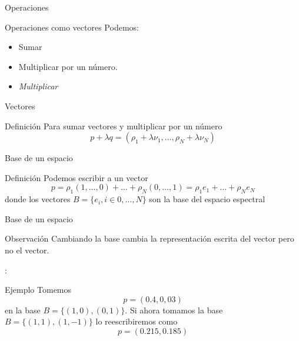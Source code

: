 \documentclass[]{beamer}
\begin{document}
\begin{frame}{Operaciones}
  \begin{block}{Operaciones como vectores}
    Podemos:
    \begin{itemize}[<+->]
      \item Sumar
      \item Multiplicar por un número.
      \item \emph{Multiplicar}
    \end{itemize}
  \end{block}
\end{frame}

\begin{frame}{Vectores}
  \begin{block}{Definición}
    Para sumar vectores y multiplicar por un número
    \begin{equation}
      p + \lambda q = (\rho_1+ \lambda \nu_1, \ldots ,\rho_N+\lambda \nu_N)
    \end{equation}
  \end{block}
\end{frame}

\begin{frame}{Base de un espacio}
  \begin{block}{Definición}
    Podemos escribir a un vector
    \begin{equation}
      p = \rho_1 (1,\ldots,0) + \ldots + \rho_N (0,\ldots,1) = \rho_1 e_1 + \ldots + \rho_N e_N
    \end{equation}
    donde los vectores $B = \{e_i, i \in 0, \ldots, N \}$ son la base del espacio espectral
  \end{block}
\end{frame}
\begin{frame}{Base de un espacio}
  \begin{block}{Observación}
    Cambiando la base cambia la representación escrita del vector pero no el vector.
  \end{block}:
  \begin{exampleblock}{Ejemplo}
    Tomemos
    \begin{equation}
      p = (0.4, 0,03)
    \end{equation} en la base $B = \{ (1,0), (0,1)\}$. \pause
    Si ahora tomamos la base $B = \{ (1,1), (1,-1)\}$ lo reescribiremos como
    \begin{equation}
      p = (0.215, 0.185)
    \end{equation}
  \end{exampleblock}
\end{frame}
\end{document}
